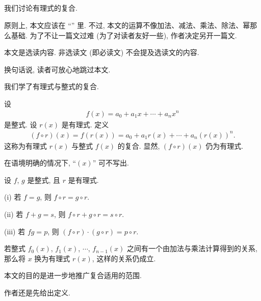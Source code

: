 \subsection*{\CompositionOfRationalExpressions}
\markright{\CompositionOfRationalExpressions}

我们讨论有理式的复合.

原则上, 本文应该在 ``\OperationsOnRationalExprsssions'' 里. 不过, 本文的运算不像加法、减法、乘法、除法、幂那么基础. 为了不让一篇文过难 (为了对读者友好一些), 作者决定另开一篇文.

本文是选读内容. 非选读文 (即必读文) 不会提及选读文的内容.

换句话说, 读者可放心地跳过本文.

\myLine

我们学了有理式与整式的复合.

\begin{definition}
    设
    \begin{align*}
        f(x) = a_0 + a_1 x + \cdots + a_n x^n
    \end{align*}
    是整式. 设 $r(x)$ 是有理式. 定义
    \begin{align*}
        (f \circ r)(x) = f(r(x)) = a_0 + a_1 r(x) + \cdots + a_n (r(x))^n.
    \end{align*}
    这称为有理式 $r(x)$ 与整式 $f(x)$ 的复合. 显然, $(f \circ r)(x)$ 仍为有理式.

    在语境明确的情况下, ``$(x)$'' 可不写出.
\end{definition}

\begin{proposition}
    设 $f$, $g$ 是整式, 且 $r$ 是有理式.

    (i) 若 $f = g$, 则 $f \circ r = g \circ r$.

    (ii) 若 $f + g = s$, 则 $f \circ r + g \circ r = s \circ r$.

    (iii) 若 $fg = p$, 则 $(f \circ r) \cdot (g \circ r) = p \circ r$.
\end{proposition}

\begin{proposition}
    若整式 $f_0 (x)$, $f_1 (x)$, $\cdots$, $f_{n-1} (x)$ 之间有一个由加法与乘法计算得到的关系, 那么将 $x$ 换为有理式 $r(x)$, 这样的关系仍成立.
\end{proposition}

本文的目的是进一步地推广复合适用的范围.

作者还是先给出定义.

